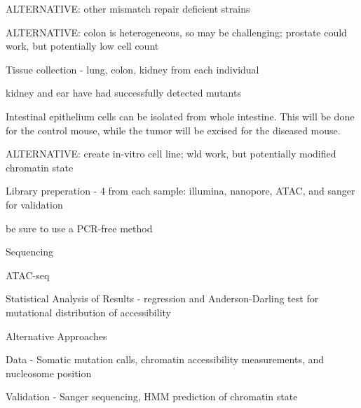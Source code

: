 \begin{outline}
\begin{outline}
\begin{outline}
				\begin{outline}
					\item ALTERNATIVE: other mismatch repair deficient strains \parencite{wei_mouse_2002}
					\item ALTERNATIVE: colon is heterogeneous, so may be challenging; prostate could work, but potentially low cell count \parencite{behjati_genome_2014}
				\end{outline}
				\item Tissue collection - lung, colon, kidney from each individual
				\begin{outline}
					\item kidney and ear have had successfully detected mutants \parencite{turker_autosomal_2003}
					\item Intestinal epithelium cells can be isolated from whole intestine. This will be done for the control mouse, while the tumor will be excised for the diseased mouse.
					\item ALTERNATIVE: create in-vitro cell line; wld work, but potentially modified chromatin state \parencite{behjati_genome_2014}
				\end{outline}
				\item Library preperation - 4 from each sample: illumina, nanopore, ATAC, and sanger for validation
				\begin{outline}
					\item be sure to use a PCR-free method
				\end{outline}
				\item Sequencing
				\item ATAC-seq
				\item Statistical Analysis of Results - regression and Anderson-Darling test for mutational distribution of accessibility
				\item Alternative Approaches
				\item Data - Somatic mutation calls, chromatin accessibility measurements, and nucleosome position
				\item Validation - Sanger sequencing, HMM prediction of chromatin state
			\end{outline}
	\end{outline}
\end{outline}
\medskip

\printbibliography















